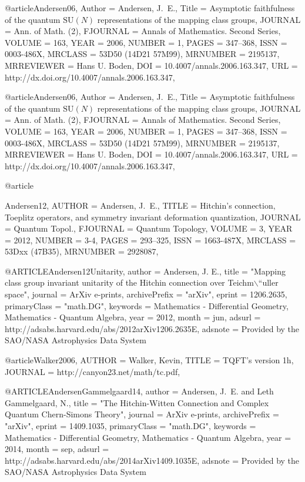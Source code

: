 @article{Andersen06,
    Author = {Andersen, J.~E.},
     Title = {Asymptotic faithfulness of the quantum $\text{SU}({N})$
              representations of the mapping class groups},
   JOURNAL = {Ann. of Math. (2)},
  FJOURNAL = {Annals of Mathematics. Second Series},
    VOLUME = {163},
      YEAR = {2006},
    NUMBER = {1},
     PAGES = {347--368},
      ISSN = {0003-486X},
   MRCLASS = {53D50 (14D21 57M99)},
  MRNUMBER = {2195137},
MRREVIEWER = {Hans U. Boden},
       DOI = {10.4007/annals.2006.163.347},
       URL = {http://dx.doi.org/10.4007/annals.2006.163.347},
}


@article{Andersen06,
    Author = {Andersen, J.~E.},
     Title = {Asymptotic faithfulness of the quantum $\text{SU}({N})$
              representations of the mapping class groups},
   JOURNAL = {Ann. of Math. (2)},
  FJOURNAL = {Annals of Mathematics. Second Series},
    VOLUME = {163},
      YEAR = {2006},
    NUMBER = {1},
     PAGES = {347--368},
      ISSN = {0003-486X},
   MRCLASS = {53D50 (14D21 57M99)},
  MRNUMBER = {2195137},
MRREVIEWER = {Hans U. Boden},
       DOI = {10.4007/annals.2006.163.347},
       URL = {http://dx.doi.org/10.4007/annals.2006.163.347},
}

@article{Andersen12,
    AUTHOR = {Andersen, J.~E.},
     TITLE = {Hitchin's connection, {T}oeplitz operators, and symmetry
              invariant deformation quantization},
   JOURNAL = {Quantum Topol.},
  FJOURNAL = {Quantum Topology},
    VOLUME = {3},
      YEAR = {2012},
    NUMBER = {3-4},
     PAGES = {293--325},
      ISSN = {1663-487X},
   MRCLASS = {53Dxx (47B35)},
  MRNUMBER = {2928087},

}

@ARTICLE{Andersen12Unitarity,
   author = {Andersen, J. E.},
    title = "{Mapping class group invariant unitarity of the Hitchin connection over Teichm$\backslash$``uller space}",
  journal = {ArXiv e-prints},
archivePrefix = "arXiv",
   eprint = {1206.2635},
 primaryClass = "math.DG",
 keywords = {Mathematics - Differential Geometry, Mathematics - Quantum Algebra},
     year = 2012,
    month = jun,
   adsurl = {http://adsabs.harvard.edu/abs/2012arXiv1206.2635E},
  adsnote = {Provided by the SAO/NASA Astrophysics Data System}
}

@article{Walker2006,
    AUTHOR = {Walker, Kevin},
     TITLE = {TQFT's version 1h},
   JOURNAL = {http://canyon23.net/math/tc.pdf},
}


@ARTICLE{AndersenGammelgaard14,
   author = {Andersen, J.~E. and {Leth Gammelgaard}, N.},
    title = "{The Hitchin-Witten Connection and Complex Quantum Chern-Simons Theory}",
  journal = {ArXiv e-prints},
archivePrefix = "arXiv",
   eprint = {1409.1035},
 primaryClass = "math.DG",
 keywords = {Mathematics - Differential Geometry, Mathematics - Quantum Algebra},
     year = 2014,
    month = sep,
   adsurl = {http://adsabs.harvard.edu/abs/2014arXiv1409.1035E},
  adsnote = {Provided by the SAO/NASA Astrophysics Data System}
}


